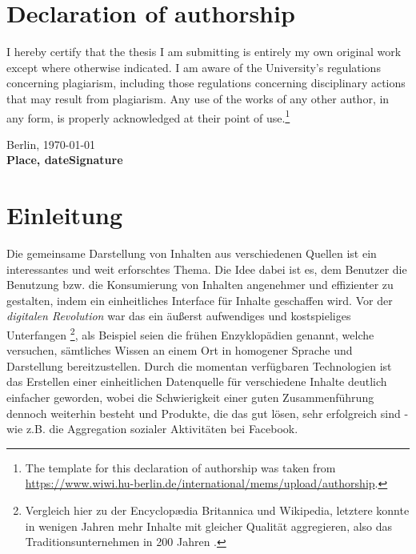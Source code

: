 \documentclass[12pt,twoside]{book}
\newcommand\blankpage{%
    \null
    \thispagestyle{empty}%
    \addtocounter{page}{-1}%
    \newpage}
\begin{document}


\chapter*{Declaration of authorship}

I hereby certify that the thesis I am submitting is entirely my own original work except where otherwise indicated. I am aware of the University's regulations concerning plagiarism, including those regulations concerning disciplinary actions that may result from plagiarism. Any use of the works of any other author, in any form, is properly acknowledged at their point of use.\footnote{The template for this declaration of authorship was taken from \url{https://www.wiwi.hu-berlin.de/international/mems/upload/authorship}.}

\vspace{2cm}

Berlin, \today\\
\textbf{Place, date}\hfill\textbf{Signature}

\tableofcontents
\newpage


\chapter{Einleitung}

Die gemeinsame Darstellung von Inhalten aus verschiedenen Quellen ist ein interessantes und weit erforschtes Thema. Die Idee dabei ist es, dem Benutzer die Benutzung bzw. die Konsumierung von Inhalten angenehmer und effizienter zu gestalten, indem ein einheitliches Interface für Inhalte geschaffen wird. Vor der \textit{digitalen Revolution} war das ein äußerst aufwendiges und kostspieliges Unterfangen \footnote{Vergleich hier zu der Encyclopædia Britannica
und Wikipedia, letztere konnte in wenigen Jahren mehr Inhalte mit gleicher Qualität aggregieren, also das Traditionsunternehmen in 200 Jahren \cite{giles2005internet}.}, als Beispiel seien die frühen Enzyklopädien genannt, welche versuchen, sämtliches Wissen an einem Ort in homogener Sprache und Darstellung bereitzustellen. Durch die momentan verfügbaren Technologien ist das Erstellen einer einheitlichen Datenquelle für verschiedene Inhalte deutlich einfacher geworden, wobei die Schwierigkeit einer guten Zusammenführung dennoch weiterhin besteht und Produkte, die das gut lösen, sehr erfolgreich sind - wie z.B. die Aggregation sozialer Aktivitäten bei Facebook.
\end{document}
